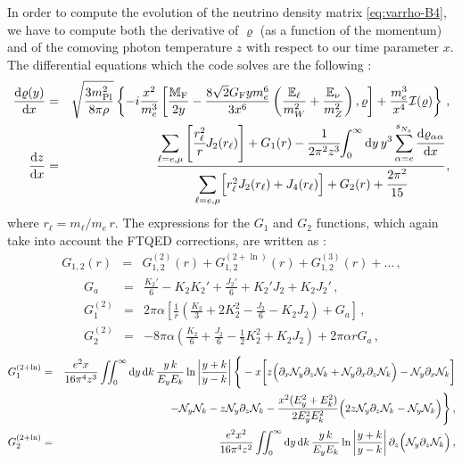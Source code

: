 \documentclass[notitlepage,showpacs,preprintnumbers,amsmath,amssymb,superscriptaddress,prd,onecolumn]{revtex4-1}
\begin{document}
In order to compute the evolution of the neutrino density matrix \eqref{eq:varrho-B4},
we have to compute both the derivative of $\varrho$ (as a function of the momentum)
and of the comoving photon temperature $z$
with respect to our time parameter $x$.
The differential equations which the code solves are the following
\cite{deSalas:2016ztq,Mirizzi:2012we,Saviano:2013ktj,Mangano:2001iu}:
%
\begin{eqnarray}\label{eq:drho_dx_nxn}
\frac{{\rm d}\varrho(y)}{{\rm d}x}
&=&
\sqrt{\frac{3 m^2_{\rm Pl}}{8\pi\rho}}
\left\{
    -i \frac{x^2}{m_e^3}
    \left[
        \frac{\mathbb{M}_{\rm F}}{2y}
        -
        \frac{8\sqrt{2}G_{\rm F} y m_e^6}{3x^6}
        \left(
            \frac{\mathbb{E}_\ell}{m_W^2}
            +
            \frac{\mathbb{E}_\nu}{m_Z^2}
        \right),
    \varrho
    \right]
    +\frac{m_e^3}{x^4}\mathcal{I(\varrho)}
\right\}\,,
\nonumber\\
\label{eq:dz_dx_nxn}
\frac{\mathrm{d}z}{\mathrm{d}x}
&=&
\cfrac{
{\displaystyle \sum_{\ell=e,\mu}}
\left[
\cfrac{r_\ell^2}{r} J_2(r_\ell)
\right]
+ G_1(r)
- \cfrac{1}{2\pi^2z^3}
    {\displaystyle \int_0^\infty \mathrm{d}y\,y^3\sum_{\alpha=e}^{s_{N_s}^{}}\cfrac{\mathrm{d}\varrho_{\alpha \alpha}}{\mathrm{d}x}}
}{
{\displaystyle \sum_{\ell=e,\mu}}
\Big[
r^2_\ell J_2(r_\ell)
+ J_4(r_\ell)
\Big]
+ G_2(r)
+ \cfrac{2\pi^2}{15}
}\,,
\end{eqnarray}
where $r_\ell=m_\ell/m_e\,r$.
The expressions for the $G_1$ and $G_2$ functions,
which again take into account the FTQED corrections, are written as
\cite{Mangano:2001iu,...}:
%
\begin{eqnarray}
G_{1,2}(r)
&=&
G_{1,2}^{(2)}(r)
+
G_{1,2}^{(2+\ln)}(r)
+
G_{1,2}^{(3)}(r)
+
\ldots
\,,
\end{eqnarray}
%
\begin{eqnarray}
G_a
&=&
\frac{K_2'}{6}
-K_2K_2'
+\frac{J_2'}{6}
+K_2'J_2
+K_2J_2'
\,,\\
G_1^{(2)}
&=&
2\pi\alpha
\left[
  \frac{1}{r}
  \left(
    \frac{K_2}{3}
    + 2 K_2^2
    -\frac{J_2}{6}
    -K_2J_2
  \right)
  +
  G_a
\right]
\label{eq:g1}
\,,\\
G_2^{(2)}
&=&
-8\pi\alpha
\left(
  \frac{K_2}{6}
  +\frac{J_2}{6}
  -\frac{1}{2}K_2^2
  +K_2J_2
\right)
+
2\pi\alpha r
G_a
\label{eq:g2}
\,,
\end{eqnarray}
%
\begin{eqnarray}
G_1^{(2+\ln)}
&=&
\frac{e^2 x}{16\pi^4 z^3}
\int\!\!\!\int_0^\infty
{\rm d}y\,
{\rm d}k\,
\frac{y\,k}{E_y E_k}
\ln\left|\frac{y+k}{y-k}\right|
\Bigg\{
-x\bigg[
  z\Big(
    \partial_x\mathcal{N}_y\partial_z\mathcal{N}_k
    +
    \mathcal{N}_y\partial_x\partial_z\mathcal{N}_k
  \Big)
  -\mathcal{N}_y\partial_x\mathcal{N}_k
\bigg]
\nonumber\\
&&
\qquad\qquad\qquad\qquad
-\mathcal{N}_y\mathcal{N}_k
-z\mathcal{N}_y\partial_z\mathcal{N}_k
-\frac{x^2 (E_y^2+E_k^2)}{2 E_y^2 E_k^2}
\Big(
2z \mathcal{N}_y\partial_z \mathcal{N}_k
-\mathcal{N}_y \mathcal{N}_k
\Big)
\Bigg\}
\,,\\
G_2^{(2+\ln)}
&=&
\frac{e^2 x^2}{16\pi^4 z^2}
\int\!\!\!\int_0^\infty
{\rm d}y\,
{\rm d}k\,
\frac{y\,k}{E_y E_k}
\ln\left|\frac{y+k}{y-k}\right|
\partial_z
\Big(
\mathcal{N}_y
\partial_z
\mathcal{N}_k
\Big)
\,,
\end{eqnarray}
\end{document}
